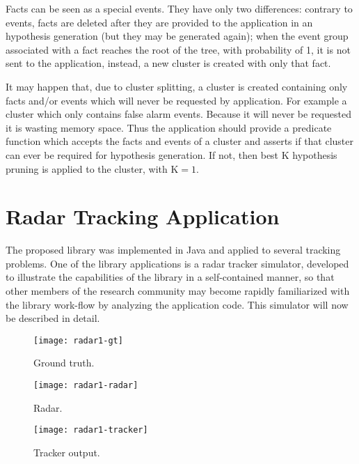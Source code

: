 Facts can be seen as a special events. They have only two differences: contrary to events, facts are deleted after they are provided to the application in an hypothesis generation (but they may be generated again); when the event group associated with a fact reaches the root of the tree, with probability of 1, it is not sent to the application, instead, a new cluster is created with only that fact.

It may happen that, due to cluster splitting, a cluster is created containing only facts and/or events which will never be requested by application. For example a cluster which only contains false alarm events. Because it will never be requested it is wasting memory space. Thus the application should provide a predicate function which accepts the facts and events of a cluster and asserts if that cluster can ever be required for hypothesis generation. If not, then best K hypothesis pruning is applied to the cluster, with K$=1$.

\section{Radar Tracking Application}
\label{sec:implementation}

The proposed library was implemented in Java and applied to several tracking problems. One of the library applications is a radar tracker simulator, developed to illustrate the capabilities of the library in a self-contained manner, so that other members of the research community may become rapidly familiarized with the library work-flow by analyzing the application code. This simulator will now be described in detail.

\ifx \ommitimages  \undefined
\begin{figure}
\begin{minipage}[b]{0.325\textwidth}
\centering
\texttt{[image: radar1-gt]}
\caption{Ground truth.}
\label{fig:radar-gt}
\end{minipage}
\begin{minipage}[b]{0.325\textwidth}
\centering
\texttt{[image: radar1-radar]}
\caption{Radar.}
\label{fig:radar-radar}
\end{minipage}
\begin{minipage}[b]{0.325\textwidth}
\centering
\texttt{[image: radar1-tracker]}
\caption{Tracker output.}
\label{fig:radar-tracker}
\end{minipage}
\end{figure}
\fi

